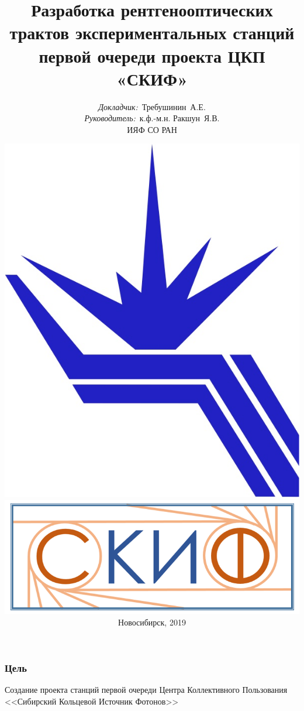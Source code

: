 \documentclass[14pt, hyperref = {colorlinks},xcolor=table ]{beamer}
\title{\small{Разработка рентгенооптических трактов экспериментальных станций первой очереди проекта ЦКП «СКИФ»}}
\author{\small{%
		\emph{Докладчик:}~Требушинин~А.Е.\\%
		\emph{Руководитель:}~к.ф.-м.н. Ракшун~Я.В.}\\%
	\vspace{30pt}%
  	ИЯФ СО РАН
	\vspace{-15pt}%
}
\date{\includegraphics[width=0.1\linewidth]{pic/logo.jpg} \hspace{20pt}
	\includegraphics[width=0.2\linewidth]{pic/SKIFlogo.png}\\
	
	\vspace{5pt}%
	\small{Новосибирск, 2019}}
\begin{document}
\maketitle

\small
\begin{frame}
\frametitle{Цель}\label{t1}
\begin{center}
	\large{Создание проекта станций первой очереди Центра Коллективного Пользования\\
	<<Сибирский Кольцевой Источник Фотонов>>}
\end{center}
\end{frame}

\end{document}
